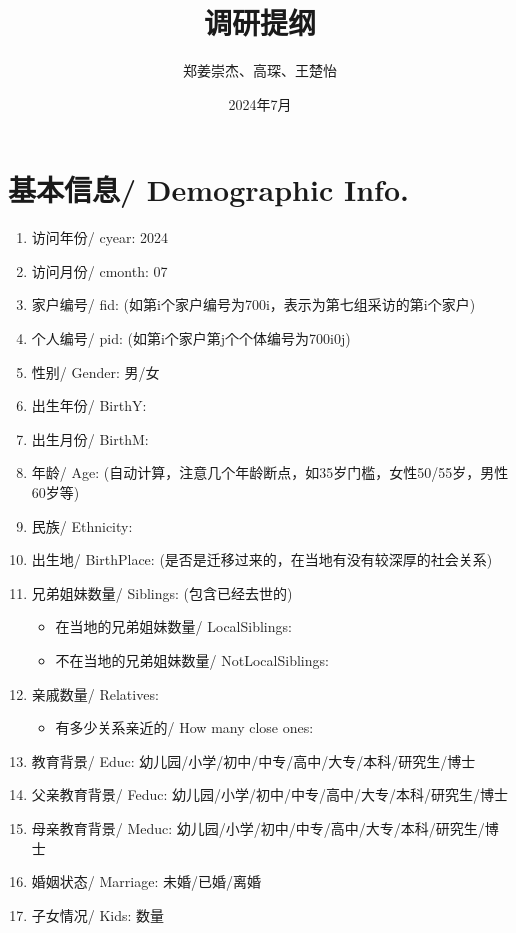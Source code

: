 \documentclass[12pt]{article}
\title{调研提纲}
\author{郑姜崇杰、高琛、王楚怡}
\date{2024年7月}
\begin{document}
\maketitle

\section{基本信息/ Demographic Info.}
\begin{enumerate}
    \item 访问年份/ cyear: 2024
    \item 访问月份/ cmonth: 07
    \item 家户编号/ fid: (如第i个家户编号为700i，表示为第七组采访的第i个家户)
    \item 个人编号/ pid: (如第i个家户第j个个体编号为700i0j)
    \item 性别/ Gender: 男/女
    \item 出生年份/ BirthY: 
    \item 出生月份/ BirthM: 
    \item 年龄/ Age: (自动计算，注意几个年龄断点，如35岁门槛，女性50/55岁，男性60岁等)
    \item 民族/ Ethnicity: 
    \item 出生地/ BirthPlace: (是否是迁移过来的，在当地有没有较深厚的社会关系)
    \item 兄弟姐妹数量/ Siblings: (包含已经去世的) 
    \begin{itemize}
        \item 在当地的兄弟姐妹数量/ LocalSiblings: 
        \item 不在当地的兄弟姐妹数量/ NotLocalSiblings: 
    \end{itemize}
    \item 亲戚数量/ Relatives: 
    \begin{itemize}
        \item 有多少关系亲近的/ How many close ones: 
    \end{itemize}
    \item 教育背景/ Educ: 幼儿园/小学/初中/中专/高中/大专/本科/研究生/博士
    \item 父亲教育背景/ Feduc: 幼儿园/小学/初中/中专/高中/大专/本科/研究生/博士
    \item 母亲教育背景/ Meduc: 幼儿园/小学/初中/中专/高中/大专/本科/研究生/博士
    \item 婚姻状态/ Marriage: 未婚/已婚/离婚
    \item 子女情况/ Kids: 数量
\end{enumerate}
\end{document}
